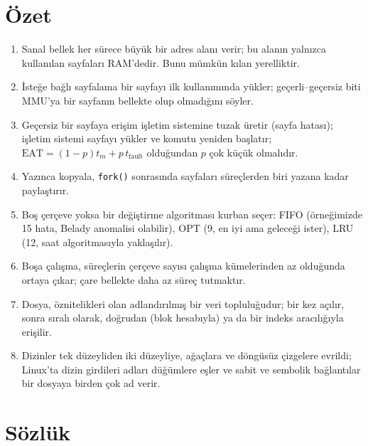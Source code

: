 \documentclass[11pt,a4paper]{article}
\newcommand{\cmd}[1]{\texttt{#1}}
\begin{document}
\section{Özet}

\begin{keyidea}
\begin{enumerate}[leftmargin=1.4em]
  \item Sanal bellek her sürece büyük bir adres alanı verir; bu alanın yalnızca kullanılan sayfaları RAM'dedir. Bunu mümkün kılan yerelliktir.
  \item İsteğe bağlı sayfalama bir sayfayı ilk kullanımında yükler; geçerli--geçersiz biti MMU'ya bir sayfanın bellekte olup olmadığını söyler.
  \item Geçersiz bir sayfaya erişim işletim sistemine tuzak üretir (sayfa hatası); işletim sistemi sayfayı yükler ve komutu yeniden başlatır; $\text{EAT} = (1-p)t_m + p\,t_{\text{fault}}$ olduğundan $p$ çok küçük olmalıdır.
  \item Yazınca kopyala, \cmd{fork()} sonrasında sayfaları süreçlerden biri yazana kadar paylaştırır.
  \item Boş çerçeve yoksa bir değiştirme algoritması kurban seçer: FIFO (örneğimizde 15 hata, Belady anomalisi olabilir), OPT (9, en iyi ama geleceği ister), LRU (12, saat algoritmasıyla yaklaşılır).
  \item Boşa çalışma, süreçlerin çerçeve sayısı çalışma kümelerinden az olduğunda ortaya çıkar; çare bellekte daha az süreç tutmaktır.
  \item Dosya, öznitelikleri olan adlandırılmış bir veri topluluğudur; bir kez açılır, sonra sıralı olarak, doğrudan (blok hesabıyla) ya da bir indeks aracılığıyla erişilir.
  \item Dizinler tek düzeyliden iki düzeyliye, ağaçlara ve döngüsüz çizgelere evrildi; Linux'ta dizin girdileri adları düğümlere eşler ve sabit ve sembolik bağlantılar bir dosyaya birden çok ad verir.
\end{enumerate}
\end{keyidea}

\section{Sözlük}
\end{document}
